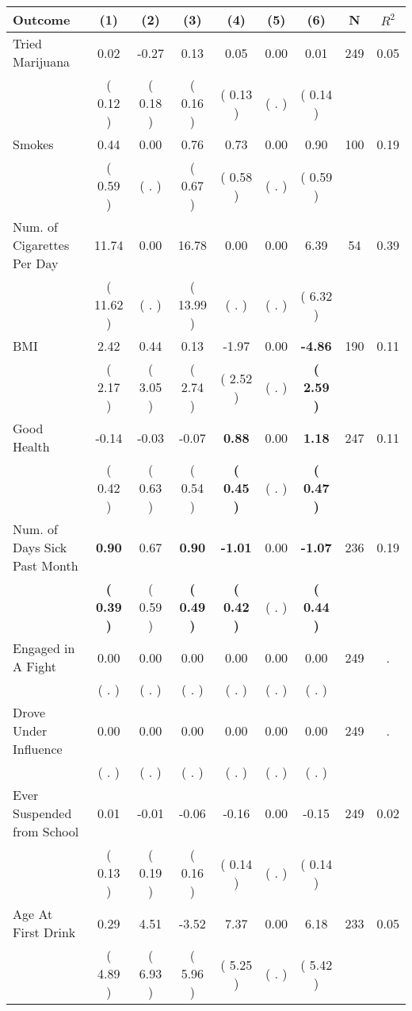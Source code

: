 \begin{tabular}{lcccccccc}
\toprule
 \textbf{Outcome} & \textbf{(1)} & \textbf{(2)} & \textbf{(3)} & \textbf{(4)} & \textbf{(5)} & \textbf{(6)} & \textbf{N} & \textbf{$ R^2$} \\
\midrule
Tried Marijuana &      0.02 &     -0.27 &      0.13 &      0.05 &      0.00 &      0.01 & 249 &       0.05 \\ 
 & (     0.12 ) & (     0.18 ) & (     0.16 ) & (     0.13 ) & (        . ) & (     0.14 ) & \\
Smokes &      0.44 &      0.00 &      0.76 &      0.73 &      0.00 &      0.90 & 100 &       0.19 \\ 
 & (     0.59 ) & (        . ) & (     0.67 ) & (     0.58 ) & (        . ) & (     0.59 ) & \\
Num. of Cigarettes Per Day &     11.74 &      0.00 &     16.78 &      0.00 &      0.00 &      6.39 & 54 &       0.39 \\ 
 & (    11.62 ) & (        . ) & (    13.99 ) & (        . ) & (        . ) & (     6.32 ) & \\
BMI &      2.42 &      0.44 &      0.13 &     -1.97 &      0.00 & \textbf{    -4.86} & 190 &       0.11 \\ 
 & (     2.17 ) & (     3.05 ) & (     2.74 ) & (     2.52 ) & (        . ) & \textbf{(     2.59 )} & \\
Good Health &     -0.14 &     -0.03 &     -0.07 & \textbf{     0.88} &      0.00 & \textbf{     1.18} & 247 &       0.11 \\ 
 & (     0.42 ) & (     0.63 ) & (     0.54 ) & \textbf{(     0.45 )} & (        . ) & \textbf{(     0.47 )} & \\
Num. of Days Sick Past Month & \textbf{     0.90} &      0.67 & \textbf{     0.90} & \textbf{    -1.01} &      0.00 & \textbf{    -1.07} & 236 &       0.19 \\ 
 & \textbf{(     0.39 )} & (     0.59 ) & \textbf{(     0.49 )} & \textbf{(     0.42 )} & (        . ) & \textbf{(     0.44 )} & \\
Engaged in A Fight &      0.00 &      0.00 &      0.00 &      0.00 &      0.00 &      0.00 & 249 &          . \\ 
 & (        . ) & (        . ) & (        . ) & (        . ) & (        . ) & (        . ) & \\
Drove Under Influence &      0.00 &      0.00 &      0.00 &      0.00 &      0.00 &      0.00 & 249 &          . \\ 
 & (        . ) & (        . ) & (        . ) & (        . ) & (        . ) & (        . ) & \\
Ever Suspended from School &      0.01 &     -0.01 &     -0.06 &     -0.16 &      0.00 &     -0.15 & 249 &       0.02 \\ 
 & (     0.13 ) & (     0.19 ) & (     0.16 ) & (     0.14 ) & (        . ) & (     0.14 ) & \\
Age At First Drink &      0.29 &      4.51 &     -3.52 &      7.37 &      0.00 &      6.18 & 233 &       0.05 \\ 
 & (     4.89 ) & (     6.93 ) & (     5.96 ) & (     5.25 ) & (        . ) & (     5.42 ) & \\
\bottomrule
\end{tabular}
